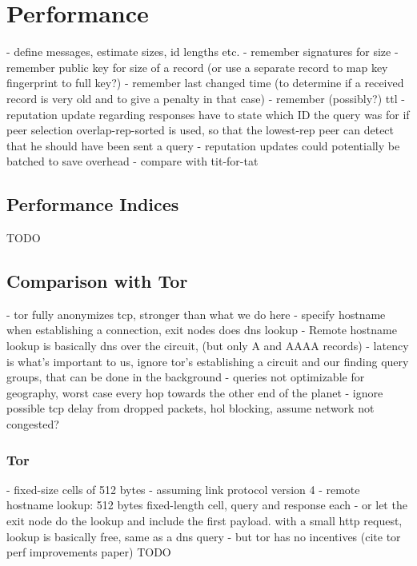\chapter{Performance}
- define messages, estimate sizes, id lengths etc.
    - remember signatures for size
    - remember public key for size of a record (or use a separate record to map
      key fingerprint to full key?)
    - remember last changed time (to determine if a received record is very old
      and to give a penalty in that case)
    - remember (possibly?) ttl
    - reputation update regarding responses have to state which ID the query was
      for if peer selection overlap-rep-sorted is used, so that the lowest-rep
      peer can detect that he should have been sent a query
- reputation updates could potentially be batched to save overhead
- compare with tit-for-tat
\section{Performance Indices}
TODO
\section{Comparison with Tor}
- tor fully anonymizes tcp, stronger than what we do here
    - specify hostname when establishing a connection, exit nodes does dns
      lookup
    - Remote hostname lookup is basically dns over the circuit, (but only A and
      AAAA records)
- latency is what's important to us, ignore tor's establishing a circuit and our
  finding query groups, that can be done in the background
- queries not optimizable for geography, worst case every hop towards the other
  end of the planet
- ignore possible tcp delay from dropped packets, hol blocking, assume network
  not congested?
\subsection{Tor}
- fixed-size cells of 512 bytes
- assuming link protocol version 4
- remote hostname lookup: 512 bytes fixed-length cell, query and response each
- or let the exit node do the lookup and include the first payload. with a small
  http request, lookup is basically free, same as a dns query
- but tor has no incentives (cite tor perf improvements paper)
TODO
